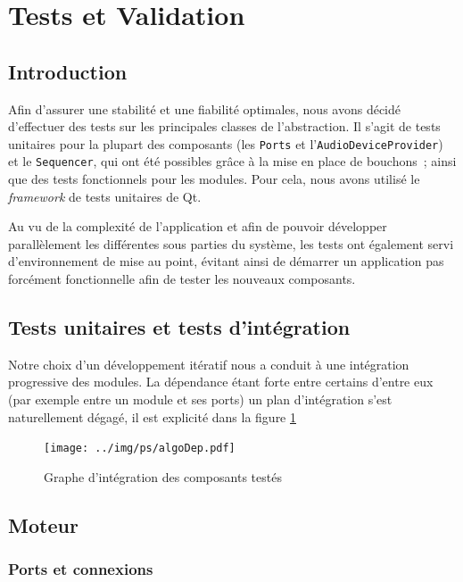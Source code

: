 \section{Tests et Validation}

\subsection{Introduction}

Afin
d'assurer une stabilité et une fiabilité optimales, nous avons décidé d'effectuer des tests sur les principales classes de l'abstraction. Il s'agit de tests unitaires pour la plupart des composants (les \verb!Ports! et l'\verb!AudioDeviceProvider!) et le \verb!Sequencer!, qui ont été possibles grâce à la mise en place de bouchons~;
ainsi que des tests fonctionnels pour les modules.
Pour cela, nous avons utilisé le \emph{framework} de tests
unitaires de Qt.

Au vu de la complexité de l'application et afin de pouvoir développer parallèlement les différentes sous parties du système, les tests ont également servi d'environnement de mise au point, évitant ainsi de démarrer un application pas forcément fonctionnelle afin de tester les nouveaux composants.

\subsection{Tests unitaires et tests d'intégration}

Notre choix d'un développement itératif nous a conduit à une intégration progressive des modules. La dépendance étant forte entre certains d'entre eux (par exemple entre un module et ses ports) un plan d'intégration s'est naturellement dégagé, il est explicité dans la figure \ref{integration}
\begin{figure}[htb]
\centering
\texttt{[image: ../img/ps/algoDep.pdf]}
\caption{Graphe d’intégration des composants testés}
\label{integration}
\end{figure}
\subsection{Moteur}

\subsubsection{Ports et connexions}


